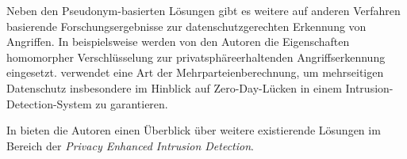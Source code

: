 
Neben den Pseudonym-basierten Lösungen gibt es weitere auf anderen Verfahren basierende Forschungsergebnisse zur datenschutzgerechten Erkennung von Angriffen. In \cite{park2007ppids} beispielsweise werden von den Autoren die Eigenschaften homomorpher Verschlüsselung zur privatsphäreerhaltenden Angriffserkennung eingesetzt. \cite{niksefat2013zids} verwendet eine Art der Mehrparteienberechnung, um mehrseitigen Datenschutz insbesondere im Hinblick auf Zero-Day-Lücken in einem Intrusion-Detection-System zu garantieren.

In \cite{niksefat2017privacy} bieten die Autoren einen Überblick über weitere existierende Lösungen im Bereich der \textit{Privacy Enhanced Intrusion Detection}.










\endinput

%
%








\todo{
Wo passen Abschnitte zu folgenden Stichworten hin?
- Verschiedene Datenarten: Identifizierend, Traffic, nicht relevant, ...
- Grundlegende Definition Insiderangriff
}

Liest man von erfolgreichen Angriffen auf Unternehmensnetzwerke, so ist die implizite Annahme von außenstehenden, unternehmensfremden Angreifern weit verbreitet. Doch häufig sind die Angreifer bereits im Netzwerk ansässig. Es handelt sich um (ehemalige) Mitarbeiter oder Personen mit legitimem Zugriff auf das Netzwerk, wie Geschäftspartnern oder Kunden. 

